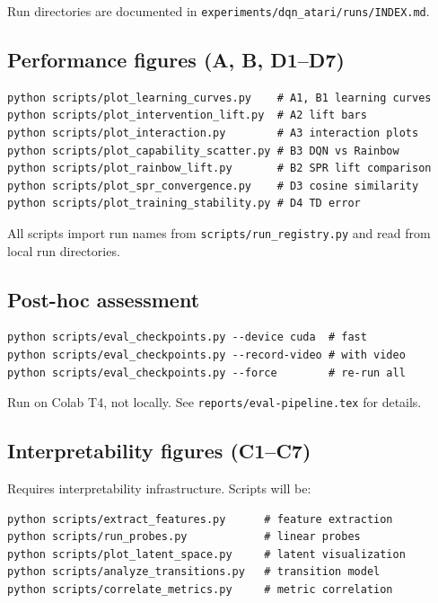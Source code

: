 \documentclass[11pt]{article}
\begin{document}
Run directories are documented in
\texttt{experiments/dqn\_atari/runs/INDEX.md}.

\subsection{Performance figures (A, B, D1--D7)}
\label{app:perf-figs}

\begin{verbatim}
python scripts/plot_learning_curves.py    # A1, B1 learning curves
python scripts/plot_intervention_lift.py  # A2 lift bars
python scripts/plot_interaction.py        # A3 interaction plots
python scripts/plot_capability_scatter.py # B3 DQN vs Rainbow
python scripts/plot_rainbow_lift.py       # B2 SPR lift comparison
python scripts/plot_spr_convergence.py    # D3 cosine similarity
python scripts/plot_training_stability.py # D4 TD error
\end{verbatim}

\noindent All scripts import run names from
\texttt{scripts/run\_registry.py} and read from local run
directories.

\subsection{Post-hoc assessment}
\label{app:reeval}

\begin{verbatim}
python scripts/eval_checkpoints.py --device cuda  # fast
python scripts/eval_checkpoints.py --record-video # with video
python scripts/eval_checkpoints.py --force        # re-run all
\end{verbatim}

\noindent Run on Colab T4, not locally. See
\texttt{reports/eval-pipeline.tex} for details.

\subsection{Interpretability figures (C1--C7)}
\label{app:interp-figs}

Requires interpretability infrastructure. Scripts will be:

\begin{verbatim}
python scripts/extract_features.py      # feature extraction
python scripts/run_probes.py            # linear probes
python scripts/plot_latent_space.py     # latent visualization
python scripts/analyze_transitions.py   # transition model
python scripts/correlate_metrics.py     # metric correlation
\end{verbatim}
\end{document}
